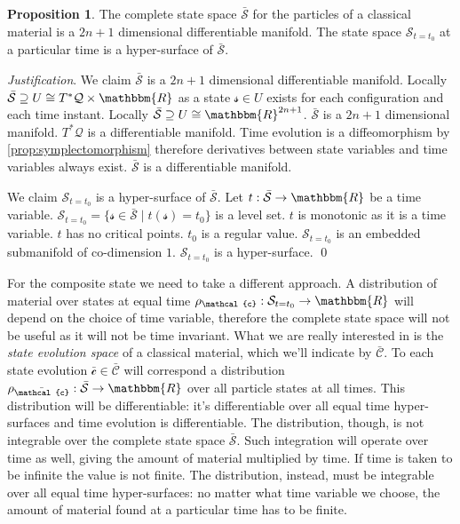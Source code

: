 \documentclass[aps,pra,10pt,twocolumn,floatfix,nofootinbib]{revtex4-1}
\numberwithin{equation}{section}
\theoremstyle{definition}
\newtheorem{prop}[equation]{Proposition}
\newenvironment{justification}{\emph{Justification}.}{\qed}
\begin{document}
\begin{prop}\label{prop:complete_particle_state_space}
	The complete state space $\bar{\mathcal{S}}$ for the particles of a classical material is a $2n+1$ dimensional differentiable manifold. The state space $\mathcal{S}_{t=t_0}$ at a particular time is a hyper-surface of $\bar{\mathcal{S}}$.
\end{prop}

\begin{justification}
	We claim $\bar{\mathcal{S}}$ is a $2n+1$ dimensional differentiable manifold. Locally $\bar{\mathcal{S}} \supseteq U \cong T^*\mathcal{Q}\times \mathbbm{R}$ as a state $\mathcal{s} \in U$ exists for each configuration and each time instant. Locally $\bar{\mathcal{S}} \supseteq U \cong\mathbbm{R}^{2n+1}$. $\bar{\mathcal{S}}$ is a $2n+1$ dimensional manifold. $T^*\mathcal{Q}$ is a differentiable manifold. Time evolution is a diffeomorphism by \ref{prop:symplectomorphism} therefore derivatives between state variables and time variables always exist. $\bar{\mathcal{S}}$ is a differentiable manifold.
	
	We claim $\mathcal{S}_{t=t_0}$ is a hyper-surface of $\bar{\mathcal{S}}$. Let $t : \bar{\mathcal{S}} \rightarrow \mathbbm{R}$ be a time variable. $\mathcal{S}_{t=t_0} = \{ \mathcal{s} \in \bar{\mathcal{S}} \; | \; t(\mathcal{s}) = t_0 \}$ is a level set. $t$ is monotonic as it is a time variable. $t$ has no critical points. $t_0$ is a regular value. $\mathcal{S}_{t=t_0}$ is an embedded submanifold of co-dimension $1$. $\mathcal{S}_{t=t_0}$ is a hyper-surface.
\end{justification}

For the composite state we need to take a different approach. A distribution of material over states at equal time $\rho_\mathcal{c} : \mathcal{S}_{t=t_0} \rightarrow \mathbbm{R}$ will depend on the choice of time variable, therefore the complete state space will not be useful as it will not be time invariant. What we are really interested in is the \emph{state evolution space} of a classical material, which we'll indicate by $\bar{\mathcal{C}}$. To each state evolution $\bar{\mathcal{c}} \in \bar{\mathcal{C}}$ will correspond a distribution $\rho_{\bar{\mathcal{c}}} : \bar{\mathcal{S}} \rightarrow \mathbbm{R}$ over all particle states at all times. This distribution will be differentiable: it's differentiable over all equal time hyper-surfaces and time evolution is differentiable. The distribution, though, is not integrable over the complete state space $\bar{\mathcal{S}}$. Such integration will operate over time as well, giving the amount of material multiplied by time. If time is taken to be infinite the value is not finite. The distribution, instead, must be integrable over all equal time hyper-surfaces: no matter what time variable we choose, the amount of material found at a particular time has to be finite.
\end{document}

